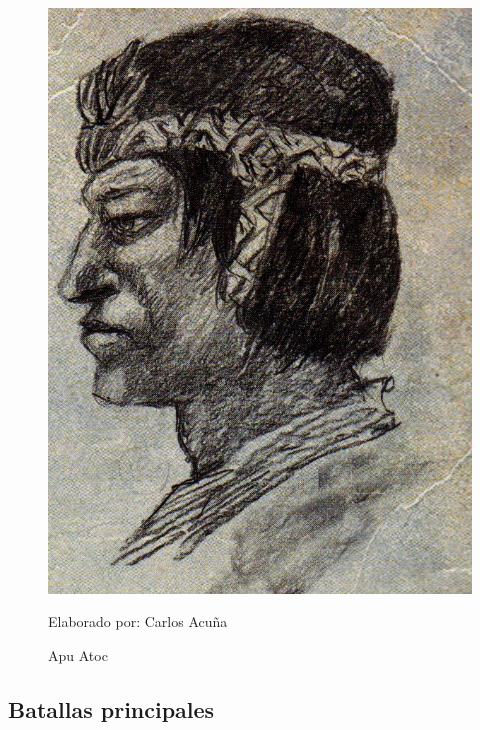 \documentclass[a4paper, openright, 12pt]{report}
\begin{document}
\begin{figure}[h]
\captionsetup{justification=centering,margin=2cm}
\includegraphics[scale=0.8]{h8}
\centering
\caption{Apu Atoc}
Elaborado por: Carlos Acuña
\label{fig:h8}
\end{figure}
\clearpage
\subsection*{Batallas principales}
\end{document}
